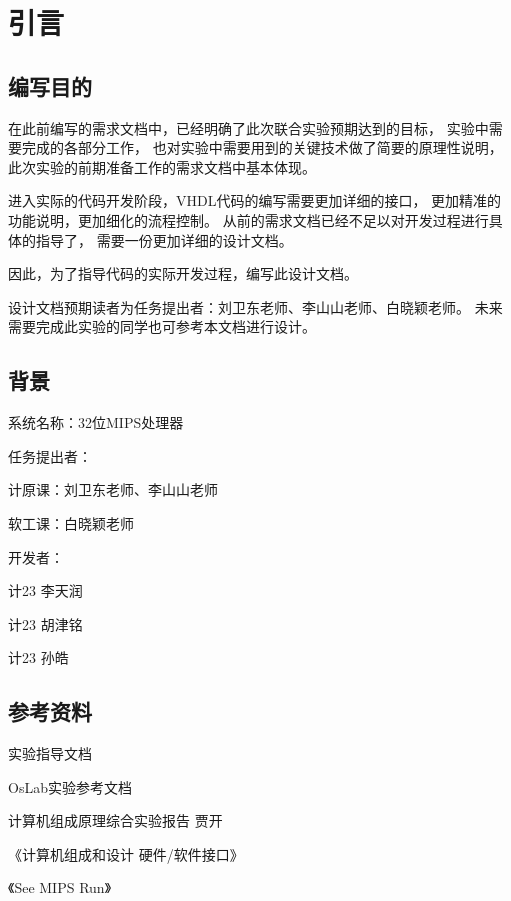 \section{引言}
    \subsection{编写目的}
        在此前编写的需求文档中，已经明确了此次联合实验预期达到的目标，%
        实验中需要完成的各部分工作，%
        也对实验中需要用到的关键技术做了简要的原理性说明，%
        此次实验的前期准备工作的需求文档中基本体现。

        进入实际的代码开发阶段，VHDL代码的编写需要更加详细的接口，%
        更加精准的功能说明，更加细化的流程控制。%
        从前的需求文档已经不足以对开发过程进行具体的指导了，%
        需要一份更加详细的设计文档。

        因此，为了指导代码的实际开发过程，编写此设计文档。

        设计文档预期读者为任务提出者：刘卫东老师、李山山老师、白晓颖老师。%
        未来需要完成此实验的同学也可参考本文档进行设计。

    \subsection{背景}
        系统名称：32位MIPS处理器

        任务提出者：
        \begin{minipage}[t]{0.5\linewidth}
        计原课：刘卫东老师、李山山老师

        软工课：白晓颖老师
        \end{minipage}
        

        开发者：
        \begin{minipage}[t]{0.5\linewidth}
        计23 李天润

        计23 胡津铭

        计23 孙皓
        \end{minipage}

    \subsection{参考资料}
        实验指导文档

        OsLab实验参考文档

        计算机组成原理综合实验报告 贾开

        《计算机组成和设计 硬件/软件接口》

        《See MIPS Run》


